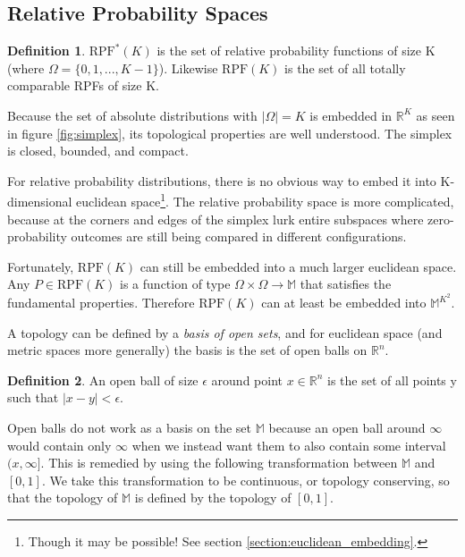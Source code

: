 \documentclass[twoside]{article}
\theoremstyle{plain}%
\theoremstyle{definition}
\newtheorem{definition}{Definition}[section]
\theoremstyle{remark}
\begin{document}
\subsection{Relative Probability Spaces}

\begin{definition}
\(\text{RPF}^{\ast}(K)\) is the set of relative probability functions of size K (where \(\Omega = \{0, 1, ..., K - 1\}\)). Likewise \(\text{RPF}(K)\) is the set of all totally comparable RPFs of size K.
\end{definition}

Because the set of absolute distributions with \(|\Omega| = K\) is embedded in \(\mathbb{R}^K\) as seen in figure \ref{fig:simplex}, its topological properties are well understood. The simplex is closed, bounded, and compact.

For relative probability distributions, there is no obvious way to embed it into K-dimensional euclidean space\footnote{Though it may be possible! See section \ref{section:euclidean_embedding}.}. The relative probability space is more complicated, because at the corners and edges of the simplex lurk entire subspaces where zero-probability outcomes are still being compared in different configurations.

Fortunately, \(\text{RPF}(K)\) can still be embedded into a much larger euclidean space. Any \(P \in \text{RPF}(K)\) is a function of type \(\Omega \times \Omega \rightarrow \mathbb{M}\) that satisfies the fundamental properties. Therefore \(\text{RPF}(K)\) can at least be embedded into \(\mathbb{M}^{K^2}\).

A topology can be defined by a \textit{basis of open sets}, and for euclidean space (and metric spaces more generally) the basis is the set of open balls on \(\mathbb{R}^n\).

\begin{definition}
An open ball of size \(\epsilon\) around point \(x \in \mathbb{R}^n\) is the set of all points y such that \(|x - y| < \epsilon\).
\end{definition}

Open balls do not work as a basis on the set \(\mathbb{M}\) because an open ball around \(\infty\) would contain only \(\infty\) when we instead want them to also contain some interval \((x, \infty]\). This is remedied by using the following transformation between \(\mathbb{M}\) and \([0, 1]\). We take this transformation to be continuous, or topology conserving, so that the topology of \(\mathbb{M}\) is defined by the topology of \([0, 1]\).
\end{document}
